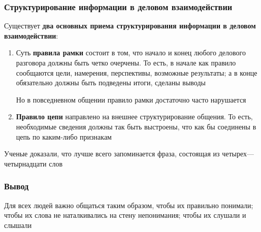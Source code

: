 \documentclass[a4paper,14pt]{extarticle}
\begin{document}
\subsubsection{Структурирование информации в деловом взаимодействии}

Существует \textbf{два основных приема структурирования информации в деловом взаимодействии}:

\begin{enumerate}
    \item Суть \textbf{правила рамки} состоит в том, что начало и конец любого делового разговора должны быть четко очерчены. То есть, в начале как правило сообщаются цели, намерения, перспективы, возможные результаты; а в конце обязательно должны быть подведены итоги, сделаны выводы

    Но в повседневном общении правило рамки достаточно часто нарушается
    \item \textbf{Правило цепи} направлено на внешнее структурирование общения. То есть, необходимые сведения должны так быть выстроены, что как бы соединены в цепь по каким-либо признакам
\end{enumerate}
    
Ученые доказали, что лучше всего запоминается фраза, состоящая из четырех—четырнадцати слов

\subsubsection{Вывод}

Для всех людей важно общаться таким образом, чтобы их правильно понимали; чтобы их слова не наталкивались на стену непонимания; чтобы их слушали и слышали
\end{document}
